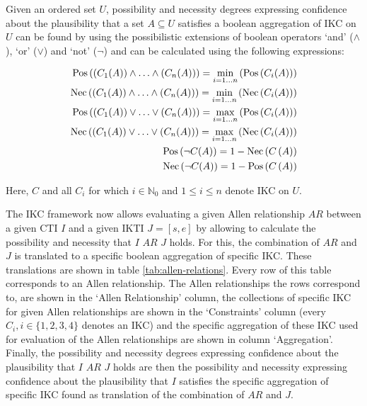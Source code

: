 Given an ordered set $U$, possibility and necessity degrees expressing confidence about the plausibility that a set $A \subseteq U$ satisfies a boolean aggregation of IKC on $U$ can be found by using the possibilistic extensions of boolean operators `and' ($\wedge$), `or' ($\vee$) and `not' ($\neg$) and can be calculated using the following expressions:

\begin{align}
\operatorname{Pos}\left(\left(C_1(A)\right) \wedge \ldots \wedge \left(C_n(A)\right)\right) = \min_{i=1 \ldots n} \left(\operatorname{Pos}\left(C_i(A)\right)\right) \nonumber \\
\operatorname{Nec}\left(\left(C_1(A)\right) \wedge \ldots \wedge \left(C_n(A)\right)\right) = \min_{i=1 \ldots n} \left(\operatorname{Nec}\left(C_i(A)\right)\right) \nonumber \\
\operatorname{Pos}\left(\left(C_1(A)\right) \vee \ldots \vee \left(C_n(A)\right)\right) = \max_{i=1 \ldots n} \left(\operatorname{Pos}\left(C_i(A)\right)\right) \nonumber \\
\operatorname{Nec}\left(\left(C_1(A)\right) \vee \ldots \vee \left(C_n(A)\right)\right) = \max_{i=1 \ldots n} \left(\operatorname{Nec}\left(C_i(A)\right)\right) \nonumber \\
\operatorname{Pos}\left(\neg C(A)\right) = 1 - \operatorname{Nec}\left(C\left(A\right)\right) \nonumber \\
\operatorname{Nec}\left(\neg C(A)\right) = 1 - \operatorname{Pos}\left(C\left(A\right)\right) \nonumber
\end{align}

Here, $C$ and all $C_i$ for which $i \in \mathbb{N}_0$ and $1 \leq i \leq n$ denote IKC on $U$.

The IKC framework now allows evaluating a given Allen relationship $AR$ between a given CTI $I$ and a given IKTI $J = \left[s, e\right]$ by allowing to calculate the possibility and necessity that $I$ $AR$ $J$ holds. For this, the combination of $AR$ and $J$ is translated to a specific boolean aggregation of specific IKC. These translations are shown in table \ref{tab:allen-relations}. Every row of this table corresponds to an Allen relationship. The Allen relationships the rows correspond to, are shown in the `Allen Relationship' column, the collections of specific IKC for given Allen relationships are shown in the `Constraints' column (every $C_i, i \in \{1, 2, 3, 4\}$ denotes an IKC) and the specific aggregation of these IKC used for evaluation of the Allen relationships are shown in column `Aggregation'. Finally, the possibility and necessity degrees expressing confidence about the plausibility that $I$ $AR$ $J$ holds are then the possibility and necessity expressing confidence about the plausibility that $I$ satisfies the specific aggregation of specific IKC found as translation of the combination of $AR$ and $J$.



